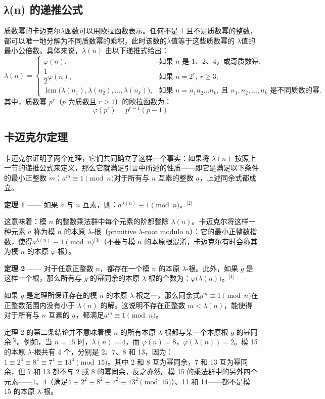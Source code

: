 \subsection{λ(n) 的递推公式}
质数幂的卡迈克尔$\lambda$函数可以用欧拉函数表示。任何不是 1 且不是质数幂的整数，都可以唯一地分解为不同质数幂的乘积，此时该数的$\lambda$值等于这些质数幂的 $\lambda$值的最小公倍数。具体来说，$\lambda(n)$ 由以下递推式给出：
$$
\lambda(n) =
\begin{cases}
\varphi(n), & \text{如果 } n \text{ 是 1、2、4，或奇质数幂}, \\[6pt]
\dfrac{1}{2} \varphi(n), & \text{如果 } n = 2^{r},\ r \geq 3, \\[8pt]
\operatorname{lcm}\bigl(\lambda(n_{1}),\lambda(n_{2}),\dots,\lambda(n_{k})\bigr), & \text{如果 } n = n_{1} n_{2} \dots n_{k}, \ \text{且 } n_{1},n_{2},\dots,n_{k} \text{ 是不同质数的幂}.
\end{cases}~
$$
其中，质数幂 $p^r$（$p$ 为质数且 $r \geq 1$）的欧拉函数为：
$$
\varphi(p^{r}) = p^{r-1}(p - 1)~
$$
\subsection{卡迈克尔定理}
卡迈克尔证明了两个定理，它们共同确立了这样一个事实：如果将 $\lambda(n)$ 按照上一节的递推公式来定义，那么它就满足引言中所述的性质——即它是满足以下条件的最小正整数 $m$：$a^{m} \equiv 1 \pmod{n}$对于所有与 $n$ 互素的整数 $a$，上述同余式都成立。

\textbf{定理 1} —— 如果 $a$ 与 $n$ 互素，则：$a^{\lambda(n)} \equiv 1 \pmod{n}$。\(^\text{[2]}\) 

这意味着：模 $n$ 的整数乘法群中每个元素的阶都整除 $\lambda(n)$。卡迈克尔将这样一种元素 $a$ 称为模 $n$ 的本原 $\lambda$-根（primitive $\lambda$-root modulo $n$）：它的最小正整数指数，使得$a^{\lambda(n)} \equiv 1 \pmod{n}$\(^\text{[3]}\)（不要与模 $n$ 的本原根混淆，卡迈克尔有时会称其为模 $n$ 的本原 $\varphi$-根）。

\textbf{定理 2} —— 对于任意正整数 $n$，都存在一个模 $n$ 的本原 $\lambda$-根。此外，如果 $g$ 是这样一个根，那么所有与 $g$ 的幂同余的本原 $\lambda$-根的个数为：$\varphi\bigl(\lambda(n)\bigr)$。\(^\text{[4]}\) 

如果 $g$ 是定理所保证存在的模 $n$ 的本原 $\lambda$-根之一，那么同余式$g^{m} \equiv 1 \pmod{n}$在正整数范围内没有小于 $\lambda(n)$ 的解。这说明不存在正整数 $m < \lambda(n)$，能使得对于所有与 $n$ 互素的 $a$，都满足$a^{m} \equiv 1 \pmod{n}$。

定理 2 的第二条结论并不意味着模 $n$ 的所有本原 $\lambda$-根都与某一个本原根 $g$ 的幂同余\(^\text{[5]}\)。例如，当 $n = 15$ 时，$\lambda(n) = 4$，而 $\varphi(n) = 8$，$\varphi(\lambda(n)) = 2$。模 15 的本原 $\lambda$-根共有 4 个，分别是 2、7、8 和 13，因为：$1 \equiv 2^{4} \equiv 8^{4} \equiv 7^{4} \equiv 13^{4} \pmod{15}$。其中 2 和 8 互为幂同余，7 和 13 互为幂同余，但 7 和 13 都不与 2 或 8 的幂同余，反之亦然。模 15 的乘法群中的另外四个元素——1、4（满足$4 \equiv 2^{2} \equiv 8^{2} \equiv 7^{2} \equiv 13^{2} \pmod{15}$）、11 和 14——都不是模 15 的本原 $\lambda$-根。

